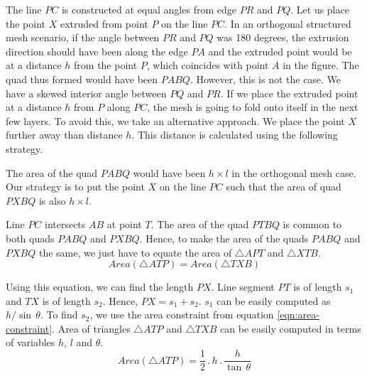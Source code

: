 The line $\mathit{PC}$ is constructed at equal angles from edge $\mathit{PR}$ and $\mathit{PQ}$. Let us place the point $\mathit{X}$ extruded from point $P$ on the line $\mathit{PC}$. In an orthogonal structured mesh scenario, if the angle between $\mathit{PR}$ and $\mathit{PQ}$ was 180 degrees, the extrusion direction should have been along the edge $\mathit{PA}$ and the extruded point would be at a distance $\mathit{h}$ from the point $\mathit{P}$, which coincides with point $\mathit{A}$ in the figure. The quad thus formed would have been $\mathit{PABQ}$. However, this is not the case. We have a skewed interior angle between $\mathit{PQ}$ and $\mathit{PR}$. If we place the extruded point at a distance $\mathit{h}$ from $\mathit{P}$ along $\mathit{PC}$, the mesh is going to fold onto itself in the next few layers. To avoid this, we take an alternative approach. We place the point $\mathit{X}$ further away than distance $\mathit{h}$. This distance is calculated using the following strategy.

The area of the quad $\mathit{PABQ}$ would have been $\mathit{h\times l}$ in the orthogonal mesh case. Our strategy is to put the point $\mathit{X}$ on the line $\mathit{PC}$ such that the area of quad $\mathit{PXBQ}$ is also $\mathit{h\times l}$.

Line $\mathit{PC}$ intersects $\mathit{AB}$ at point $\mathit{T}$. The area of the quad $\mathit{PTBQ}$ is common to both quads $\mathit{PABQ}$ and $\mathit{PXBQ}$. Hence, to make the area of the quads $\mathit{PABQ}$ and $\mathit{PXBQ}$ the same, we just have to equate the area of $\mathit{\bigtriangleup APT}$ and $\mathit{\bigtriangleup XTB}$.
\begin{equation}
    Area(\mathit{\bigtriangleup ATP}) = Area(\mathit{\bigtriangleup TXB})
    \label{eqn:area-constraint}
\end{equation}

Using this equation, we can find the length $\mathit{PX}$. Line segment $\mathit{PT}$ is of length $s_1$ and $\mathit{TX}$ is of length $s_2$. Hence, $\mathit{PX = s_1 + s_2}$. $s_1$ can be easily computed as $h/\sin \, \theta$. To find $s_2$, we use the area constraint from equation \ref{eqn:area-constraint}. Area of triangles $\mathit{\bigtriangleup ATP}$ and $\mathit{\bigtriangleup TXB}$ can be easily computed in terms of variables $h$, $l$ and $\theta$.
\begin{equation}
    Area(\mathit{\bigtriangleup ATP}) = \dfrac{1}{2} \, . \,  h \, .  \, \dfrac{h}{\tan \, \theta}
    \label{eqn-area1}
\end{equation}

